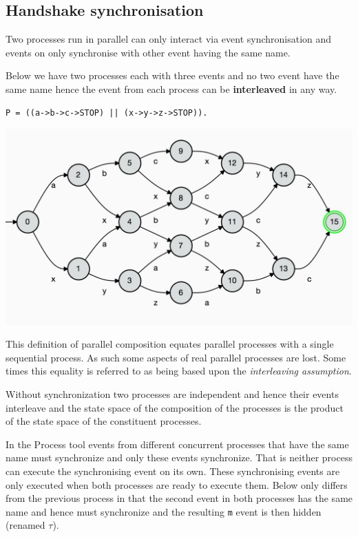 \documentclass[]{article}
\begin{document}
\subsection{Handshake synchronisation }

Two processes run in parallel can only interact via event synchronisation and events on only synchronise with other event having the same name.

Below we have two processes each with three events and no two event have the same name hence the event from each process can be {\bf interleaved} in any way.

 \begin{center}
\begin{minipage}{0.4\textwidth}
\begin{verbatim}
P = ((a->b->c->STOP) || (x->y->z->STOP)).
\end{verbatim}
\end{minipage}
\includegraphics[scale=0.2]{par.jpg}
\end{center}
This definition of parallel composition equates parallel processes with a single sequential process. As such some aspects  of real parallel processes are lost. Some times this  equality is referred to as being based upon the \emph{interleaving assumption}.



Without synchronization  two processes   are independent and hence their events interleave and the state space of the composition of the processes is the product of the state space of the constituent processes.


   In the Process tool events from different concurrent processes that have the same name must synchronize and only these events synchronize. That is neither process can  execute the synchronising event on its own.  These  synchronising events are only executed when both processes are ready to execute them.
  Below only differs  from the previous process in that the second event in both processes has the same name and hence must  synchronize and the resulting \verb$m$ event is then hidden (renamed $\tau$).
\end{document}
